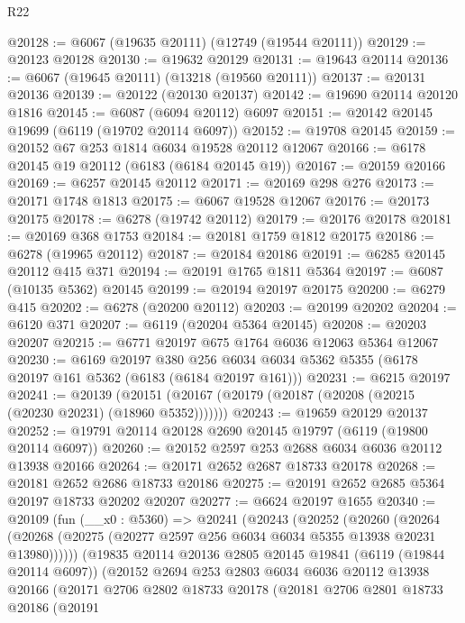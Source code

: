\begin{lexlean}{R22}
\begin{coremodule}
@20128 := @6067 (@19635 @20111) (@12749 (@19544 @20111))
@20129 := @20123 @20128
@20130 := @19632 @20129
@20131 := @19643 @20114
@20136 := @6067 (@19645 @20111) (@13218 (@19560 @20111))
@20137 := @20131 @20136
@20139 := @20122 (@20130 @20137)
@20142 := @19690 @20114 @20120 @1816
@20145 := @6087 (@6094 @20112) @6097
@20151 := @20142 @20145 @19699 (@6119 (@19702 @20114 @6097))
@20152 := @19708 @20145
@20159 := @20152 @67 @253 @1814 @6034 @19528 @20112 @12067
@20166 := @6178 @20145 @19 @20112 (@6183 (@6184 @20145 @19))
@20167 := @20159 @20166
@20169 := @6257 @20145 @20112
@20171 := @20169 @298 @276
@20173 := @20171 @1748 @1813
@20175 := @6067 @19528 @12067
@20176 := @20173 @20175
@20178 := @6278 (@19742 @20112)
@20179 := @20176 @20178
@20181 := @20169 @368 @1753
@20184 := @20181 @1759 @1812 @20175
@20186 := @6278 (@19965 @20112)
@20187 := @20184 @20186
@20191 := @6285 @20145 @20112 @415 @371
@20194 := @20191 @1765 @1811 @5364
@20197 := @6087 (@10135 @5362) @20145
@20199 := @20194 @20197 @20175
@20200 := @6279 @415
@20202 := @6278 (@20200 @20112)
@20203 := @20199 @20202
@20204 := @6120 @371
@20207 := @6119 (@20204 @5364 @20145)
@20208 := @20203 @20207
@20215 := @6771 @20197 @675 @1764 @6036 @12063 @5364 @12067
@20230 := @6169
    @20197
    @380
    @256
    @6034
    @6034
    @5362
    @5355
    (@6178 @20197 @161 @5362 (@6183 (@6184 @20197 @161)))
@20231 := @6215 @20197
@20241 := @20139
    (@20151 (@20167 (@20179 (@20187 (@20208 (@20215 (@20230 @20231) (@18960 @5352)))))))
@20243 := @19659 @20129 @20137
@20252 := @19791 @20114 @20128 @2690 @20145 @19797 (@6119 (@19800 @20114 @6097))
@20260 := @20152 @2597 @253 @2688 @6034 @6036 @20112 @13938 @20166
@20264 := @20171 @2652 @2687 @18733 @20178
@20268 := @20181 @2652 @2686 @18733 @20186
@20275 := @20191 @2652 @2685 @5364 @20197 @18733 @20202 @20207
@20277 := @6624 @20197 @1655
@20340 := @20109
    (fun (__x0 : @5360) =>
    @20241
      (@20243
        (@20252
          (@20260
            (@20264 (@20268 (@20275 (@20277 @2597 @256 @6034 @6034 @5355 @13938 @20231 @13980))))))
        (@19835
          @20114
          @20136
          @2805
          @20145
          @19841
          (@6119 (@19844 @20114 @6097))
          (@20152
            @2694
            @253
            @2803
            @6034
            @6036
            @20112
            @13938
            @20166
            (@20171
              @2706
              @2802
              @18733
              @20178
              (@20181
                @2706
                @2801
                @18733
                @20186
                (@20191

\end{coremodule}
\end{lexlean}
